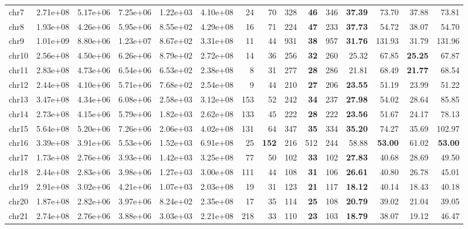 \begin{table*}[!ht]
\begin{tabular}{@{}lrrrrrrrrrrrrrr@{}}
		chr7 & 2.71e+08 & 5.17e+06 & 7.25e+06 & 1.22e+03 & 4.10e+08 & 24 & 70 & 328 & \textbf{46} & 346 & \textbf{37.39} & 73.70 & 37.88 & 73.81 \\ 
		chr8 & 1.93e+08 & 4.26e+06 & 5.95e+06 & 8.55e+02 & 4.29e+08 & 16 &71 & 224 & \textbf{47} & 233 & \textbf{37.73} & 54.72 & 38.07 & 54.70 \\ 
		chr9 & 1.01e+09 & 8.80e+06 & 1.23e+07 & 8.67e+02 & 3.31e+08 & 11 & 44 & 931 & \textbf{38} & 957 & \textbf{31.76} & 131.93 & 31.79 & 131.96 \\ 
		chr10 & 2.56e+08 & 4.50e+06 & 6.26e+06 & 8.79e+02 & 2.72e+08 & 14 & 36 & 256 & \textbf{32} & 260 & 25.32 & 67.85 & \textbf{25.25} & 67.87 \\ 
		chr11 & 2.83e+08 & 4.73e+06 & 6.54e+06 & 6.53e+02 & 2.38e+08 & 8 & 31 & 277 & \textbf{28} & 286 & 21.81 & 68.49 & \textbf{21.77} & 68.54 \\ 
		chr12 & 2.44e+08 & 4.10e+06 & 5.71e+06 & 7.68e+02 & 2.54e+08 & 9 & 44 & 210 & \textbf{27} & 206 & \textbf{23.55} & 51.19 & 23.99 & 51.22 \\ 
		chr13 & 3.47e+08 & 4.34e+06 & 6.08e+06 & 2.58e+03 & 3.12e+08 & 153 & 52 & 242 & \textbf{34} & 237 & \textbf{27.98} & 54.02 & 28.64 & 85.85 \\ 
		chr14 & 2.73e+08 & 4.15e+06 & 5.79e+06 & 1.82e+03 & 2.62e+08 & 133 & 45 & 222 & \textbf{28} & 222 & \textbf{23.56} & 51.67 & 24.17 & 78.13 \\ 
		chr15 & 5.64e+08 & 5.20e+06 & 7.26e+06 & 2.06e+03 & 4.02e+08 & 131 & 64 & 347 & \textbf{35} & 334 & \textbf{35.20} & 74.27 & 35.69 & 102.97 \\ 
		chr16 & 3.39e+08 & 3.91e+06 & 5.53e+06 & 1.52e+03 & 6.91e+08 & 25 & \textbf{152} & 216 & 512 & 244 & 58.88 & \textbf{53.00} & 61.02 & \textbf{53.00} \\ 
		chr17 & 1.73e+08 & 2.76e+06 & 3.93e+06 & 1.42e+03 & 3.25e+08 & 77 & 50 & 102 & \textbf{33} & 102 & \textbf{27.83} & 40.68 & 28.69 & 49.50 \\ 
		chr18 & 2.44e+08 & 2.83e+06 & 3.98e+06 & 1.27e+03 & 3.00e+08 & 111 & 44 & 108 & \textbf{31} & 106 & \textbf{26.61} & 40.80 & 26.78 & 45.01 \\ 
		chr19 & 2.91e+08 & 3.02e+06 & 4.21e+06 & 1.07e+03 & 2.03e+08 & 19 & 31 & 123 & \textbf{21} & 117 & \textbf{18.12} & 40.14 & 18.43 & 40.18 \\ 
		chr20 & 1.87e+08 & 2.82e+06 & 3.97e+06 & 8.24e+02 & 2.35e+08 & 17 & 35 & 114 & \textbf{25} & 108 & \textbf{20.79} & 39.02 & 21.04 & 39.05 \\ 
		chr21 & 2.74e+08 & 2.76e+06 & 3.88e+06 & 3.03e+03 & 2.21e+08 & 218 & 33 & 110 & \textbf{23} & 103 & \textbf{18.79} & 38.07 & 19.12 & 46.47 \\ 

\end{tabular}
\end{table*}
